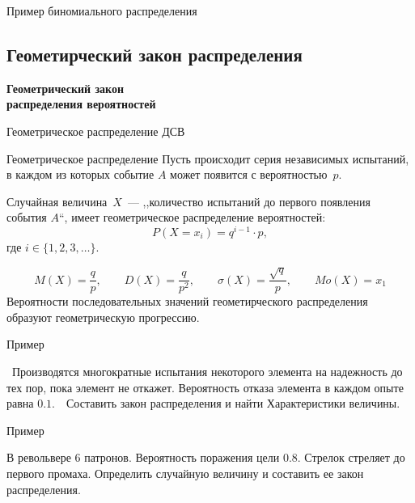 \documentclass[unicode,11pt,notheorems,xcolor=table]{beamer}
\begin{document}
\begin{frame}[t, allowframebreaks]{Пример биномиального распределения}{}
\begin{tikzpicture}[y=3mm,>=latex]
        \end{tikzpicture}

\end{frame}


\subsection{Геометирческий закон распределения}

\begin{frame}{}{}
    {\centering \bfseries \Large Геометрический закон \\распределения вероятностей\par}
\end{frame}
\begin{frame}{Геометрическое распределение ДСВ}{}

    \begin{block}{Геометрическое распределение}
        Пусть происходит серия независимых испытаний, в каждом из которых событие $A$ может появится с вероятностью $p$. 
        
        \smallskip
        Случайная величина $X$~--- ,,количество испытаний до первого появления события $A$``, имеет \alert{геометрическое распределение} вероятностей:
        $$
            P(X=x_i) = q^{i-1}\cdot p, 
        $$
        где $i \in \{1,2,3,\ldots\}$.
    \end{block}
    $$
     M(X)= \frac{q}{p},\qquad D(X)=\frac{q}{p^2}, \qquad \sigma(X)=\frac{\sqrt{q}}{p}, \qquad Mo(X)=x_1
    $$
    Вероятности последовательных значений  геометирческого распределения образуют геометрическую прогрессию.
\end{frame}

\begin{frame}[t]{Пример}{}
\begin{exampleblock}{}
     Производятся многократные испытания некоторого элемента на надежность до тех пор, пока элемент не откажет. 
    Вероятность отказа элемента в каждом опыте равна $0.1$.  Составить закон распределения и найти Характеристики величины.
\end{exampleblock}
\end{frame}

\begin{frame}[t]{Пример}{}
    \begin{exampleblock}{}
        В револьвере 6 патронов. Вероятность поражения цели $0.8$. Стрелок стреляет до первого промаха. Определить случайную величину и составить ее закон распределения.
    \end{exampleblock}
    \end{frame}
    
\end{document}
